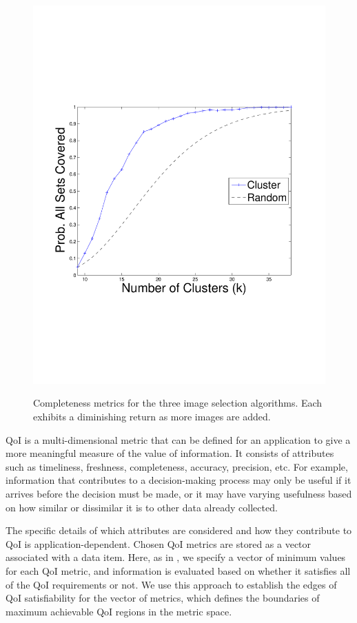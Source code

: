 \begin{figure}
{        \includegraphics[clip=true, trim = 16mm 65mm 25mm 70mm, scale=0.23]{figures/cluster/perc_all_sets_covered_vary_k_color.pdf}
        \label{fig:clusterAvgNumSetsCov}
        }        
   \caption{Completeness metrics for the three image selection algorithms. Each exhibits a diminishing return as more images are added.}
   \label{fig:completeness_exp_results}
\end{figure}

QoI is a multi-dimensional metric that can be defined for an application to give a more meaningful measure of the value of information.  It consists of attributes such as  timeliness, freshness, completeness, accuracy, precision, etc.  
For example, information that contributes to a decision-making process may only be useful if it arrives before the decision must be made, or it may have varying usefulness based on how similar or dissimilar it is to other data already collected.

The specific details of which attributes are considered and how they contribute to QoI is application-dependent.  Chosen QoI metrics are stored as a vector associated with a data item.  
Here, as in \cite{qoi_aware_tactical_mil_nets}, we specify a vector of minimum values for each QoI metric, and 
information is evaluated based on whether it satisfies all of the QoI requirements or not.  We use this approach to establish the edges of QoI satisfiability for the vector of metrics, which defines the boundaries of maximum achievable QoI regions in the metric space.


